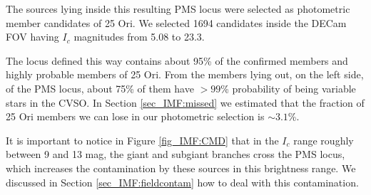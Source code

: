 \documentclass[12pt]{article}
\begin{document}
The sources lying inside this resulting PMS locus were selected as photometric member candidates of 25 Ori. We selected 1694 candidates inside the DECam FOV having $I_c$ magnitudes from 5.08 to 23.3.

The locus defined this way contains about 95\% of the confirmed members and highly probable members of 25 Ori. From the members lying out, on the left side, of the PMS locus, about 75\% of them have $>99$\% probability of being variable stars in the CVSO. In Section \ref{sec_IMF:missed} we estimated that the fraction of 25 Ori members we can lose in our photometric selection is $\sim3.1$\%.

It is important to notice in Figure \ref{fig_IMF:CMD} that in the $I_c$ range roughly between 9 and 13 mag, the giant and subgiant branches cross the PMS locus, which increases the contamination by these sources in this brightness range. We discussed in Section \ref{sec_IMF:fieldcontam} how to deal with this contamination.
\end{document}
